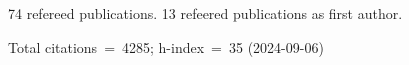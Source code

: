 74 refereed publications. 13 refeered publications as first author.

Total citations~=~4285; h-index~=~35 (2024-09-06)